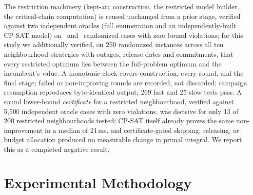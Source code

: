 \documentclass[letterpaper]{article} %
\begin{document}
The restriction machinery (kept-arc construction, the restricted model builder, the critical-chain computation) is reused unchanged from a prior stage, verified against two independent oracles (full enumeration and an independently-built CP-SAT model) on \OracleEnumCases\ and \OracleCpsatCases\ randomized cases with zero bound violations; for this study we additionally verified, on 250 randomized instances across all ten neighbourhood strategies with outages, release dates and commitments, that every restricted optimum lies between the full-problem optimum and the incumbent's value. A monotonic clock covers construction, every round, and the final stage; failed or non-improving rounds are recorded, not discarded; campaign resumption reproduces byte-identical output; 269 fast and 25 slow tests pass. A sound lower-bound \emph{certificate} for a restricted neighbourhood, verified against 5{,}500 independent oracle cases with zero violations, was decisive for only 13 of 200 restricted neighbourhoods tested; CP-SAT itself already proves the same non-improvement in a median of 21\,ms, and certificate-gated skipping, releasing, or budget allocation produced no measurable change in primal integral. We report this as a completed negative result.

\section{Experimental Methodology}
\label{sec:methodology}
\end{document}

